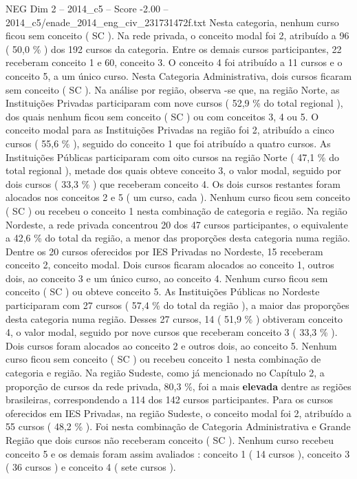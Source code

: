 \begin{textsample}{NEG Dim 2 – 2014\_c5 – Score -2.00 – 2014\_c5/enade\_2014\_eng\_civ\_231731472f.txt}
Nesta categoria, nenhum curso ficou sem conceito ( SC ).
Na rede privada, o conceito modal foi 2, atribuído a 96 ( 50,0 \% ) dos 192 cursos da categoria.
Entre os demais cursos participantes, 22 receberam conceito 1 e 60, conceito 3.
O conceito 4 foi atribuído a 11 cursos e o conceito 5, a um único curso.
Nesta Categoria Administrativa, dois cursos ficaram sem conceito ( SC ).
Na análise por região, observa -se que, na região Norte, as Instituições Privadas participaram com nove cursos ( 52,9 \% do total regional ), dos quais nenhum ficou sem conceito ( SC ) ou com conceitos 3, 4 ou 5.
O conceito modal para as Instituições Privadas na região foi 2, atribuído a cinco cursos ( 55,6 \% ), seguido do conceito 1 que foi atribuído a quatro cursos.
As Instituições Públicas participaram com oito cursos na região Norte ( 47,1 \% do total regional ), metade dos quais obteve conceito 3, o valor modal, seguido por dois cursos ( 33,3 \% ) que receberam conceito 4.
Os dois cursos restantes foram alocados nos conceitos 2 e 5 ( um curso, cada ).
Nenhum curso ficou sem conceito ( SC ) ou recebeu o conceito 1 nesta combinação de categoria e região.
Na região Nordeste, a rede privada concentrou 20 dos 47 cursos participantes, o equivalente a 42,6 \% do total da região, a menor das proporções desta categoria numa região.
Dentre os 20 cursos oferecidos por IES Privadas no Nordeste, 15 receberam conceito 2, conceito modal.
Dois cursos ficaram alocados ao conceito 1, outros dois, ao conceito 3 e um único curso, ao conceito 4.
Nenhum curso ficou sem conceito ( SC ) ou obteve conceito 5.
As Instituições Públicas no Nordeste participaram com 27 cursos ( 57,4 \% do total da região ), a maior das proporções desta categoria numa região.
Desses 27 cursos, 14 ( 51,9 \% ) obtiveram conceito 4, o valor modal, seguido por nove cursos que receberam conceito 3 ( 33,3 \% ).
Dois cursos foram alocados ao conceito 2 e outros dois, ao conceito 5.
Nenhum curso ficou sem conceito ( SC ) ou recebeu conceito 1 nesta combinação de categoria e região.
Na região Sudeste, como já mencionado no Capítulo 2, a proporção de cursos da rede privada, 80,3 \%, foi a mais \textbf{elevada} dentre as regiões brasileiras, correspondendo a 114 dos 142 cursos participantes.
Para os cursos oferecidos em IES Privadas, na região Sudeste, o conceito modal foi 2, atribuído a 55 cursos ( 48,2 \% ).
Foi nesta combinação de Categoria Administrativa e Grande Região que dois cursos não receberam conceito ( SC ).
Nenhum curso recebeu conceito 5 e os demais foram assim avaliados : conceito 1 ( 14 cursos ), conceito 3 ( 36 cursos ) e conceito 4 ( sete cursos ).

\end{textsample}
